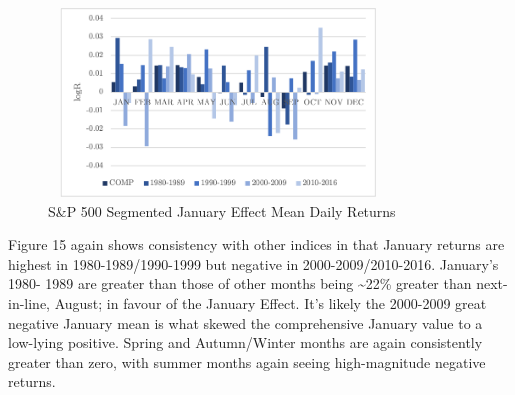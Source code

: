 \documentclass[11pt, english]{article}
\begin{document}
	\begin{figure}[H]
        \begin{center}
                \includegraphics[width=9cm,height=5cm]{SP-JE2.png}  
                \caption{S\&P 500 Segmented January Effect Mean Daily Returns}
        \end{center}
        \end{figure}

	Figure 15 again shows consistency with other indices in that January returns are highest in 1980-1989/1990-1999 but negative in 2000-2009/2010-2016. January’s 1980- 1989 are greater than those of other months being \~{}22\% greater than next-in-line, August; in favour of the January Effect. It’s likely the 2000-2009 great negative January mean is what skewed the comprehensive January value to a low-lying positive. Spring and Autumn/Winter months are again consistently greater than zero, with summer months again seeing high-magnitude negative returns.
\end{document}
